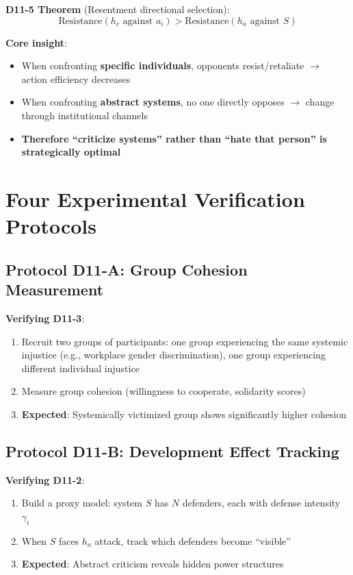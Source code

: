 \documentclass[12pt,a4paper]{article}
\begin{document}
\textbf{D11-5 Theorem} (Resentment directional selection):
$$\text{Resistance}(h_c \text{ against } a_i) > \text{Resistance}(h_a \text{ against } S)$$

\textbf{Core insight}:
\begin{itemize}
    \item When confronting \textbf{specific individuals}, opponents resist/retaliate $\to$ action efficiency decreases
    \item When confronting \textbf{abstract systems}, no one directly opposes $\to$ change through institutional channels
    \item \textbf{Therefore ``criticize systems'' rather than ``hate that person'' is strategically optimal}
\end{itemize}

\section{Four Experimental Verification Protocols}

\subsection{Protocol D11-A: Group Cohesion Measurement}

\textbf{Verifying D11-3}:
\begin{enumerate}
    \item Recruit two groups of participants: one group experiencing the same systemic injustice (e.g., workplace gender discrimination), one group experiencing different individual injustice
    \item Measure group cohesion (willingness to cooperate, solidarity scores)
    \item \textbf{Expected}: Systemically victimized group shows significantly higher cohesion
\end{enumerate}

\subsection{Protocol D11-B: Development Effect Tracking}

\textbf{Verifying D11-2}:
\begin{enumerate}
    \item Build a proxy model: system $S$ has $N$ defenders, each with defense intensity $\gamma_i$
    \item When $S$ faces $h_a$ attack, track which defenders become ``visible''
    \item \textbf{Expected}: Abstract criticism reveals hidden power structures
\end{enumerate}
\end{document}
